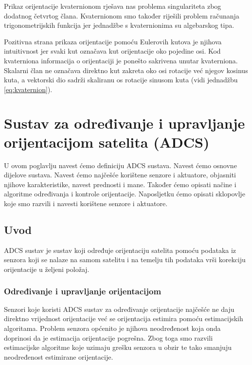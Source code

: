 \documentclass[times, utf8, diplomski, numeric]{templates/template}
\begin{document}
{{        Prikaz orijentacije kvaternionom rješava nas problema singulariteta zbog dodatnog četvrtog člana. Kvaternionom smo također riješili problem računanja trigonometrijskih funkcija jer jednadžbe s kvaternionima su algebarskog tipa.

        Pozitivna strana prikaza orijentacije pomoću Eulerovih kutova je njihova intuitivnost jer svaki kut označava kut orijentacije oko pojedine osi. Kod kvaterniona informacija o orijentaciji je ponešto sakrivena unutar kvaterniona. Skalarni član ne označava direktno kut zakreta oko osi rotacije već njegov kosinus kuta, a vektorski dio sadrži skaliranu os rotacije sinusom kuta (vidi jednadžbu \ref{eq:kvaternion}).
    }
}

\chapter{Sustav za određivanje i upravljanje orijentacijom satelita (ADCS)}{
    U ovom poglavlju navest ćemo definiciju ADCS  sustava. Navest ćemo osnovne dijelove sustava. Navest ćemo najčešće korištene senzore i aktuatore, objasniti njihove karakteristike, navest prednosti i mane. Također ćemo opisati načine i algoritme određivanja i kontrole orijentacije. Naposljetku ćemo opisati sklopovlje koje smo razvili i navesti korištene senzore i aktuatore. 

    \section{Uvod}{
        ADCS  sustav je sustav koji određuje orijentaciju satelita pomoću podataka iz senzora koji se nalaze na samom satelitu i na temelju tih podataka vrši korekciju orijentacije u željeni položaj. 

        \subsection{Određivanje i upravljanje orijentacijom}{
            Senzori koje koristi ADCS sustav za određivanje orijentacije najčešće ne daju direktno vrijednost orijentacije već se orijentacija estimira pomoću estimacijskih algoritama. Problem senzora općenito je njihova neodređenost koja onda doprinosi da je estimacija orijentacije pogrešna. Zbog toga smo razvili estimacijske algoritme koje uzimaju grešku senzora u obzir te tako smanjuju neodređenost estimirane orijentacije.

}}}
\end{document}
